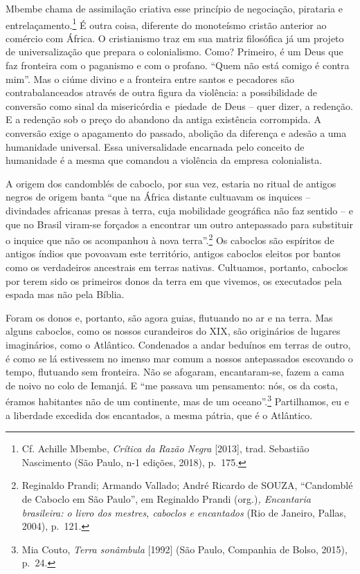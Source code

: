 Mbembe chama de assimilação criativa esse princípio de negociação,
pirataria e entrelaçamento.\footnote{Cf. Achille Mbembe, \emph{Crítica
  da Razão Negra} {[}2013{]}, trad. Sebastião Nascimento (São Paulo, n-1
  edições, 2018), p.~175.} É outra coisa, diferente do monoteísmo
cristão anterior ao comércio com África. O cristianismo traz em sua
matriz filosófica já um projeto de universalização que prepara o
colonialismo. Como? Primeiro, é um Deus que faz fronteira com o
paganismo e com o profano. ``Quem não está comigo é contra mim''. Mas o
ciúme divino e a fronteira entre santos e pecadores são
contrabalanceados através de outra figura da violência: a possibilidade
de conversão como sinal da misericórdia e~piedade~de Deus -- quer dizer,
a redenção. E a redenção sob o preço do abandono da antiga existência
corrompida. A conversão exige o apagamento do passado, abolição da
diferença e adesão a uma humanidade universal. Essa universalidade
encarnada pelo conceito de humanidade é a mesma que comandou a violência
da empresa colonialista.

A origem dos candomblés de caboclo, por sua vez, estaria no ritual de
antigos negros de origem banta ``que na África distante cultuavam os
inquices -- divindades africanas presas à terra, cuja mobilidade
geográfica não faz sentido -- e que no Brasil viram-se forçados a
encontrar um outro antepassado para substituir o inquice que não os
acompanhou à nova terra''.\footnote{Reginaldo Prandi; Armando Vallado;
  André Ricardo de SOUZA, ``Candomblé de Caboclo em São Paulo'', em
  Reginaldo Prandi (org.)\emph{, Encantaria brasileira: o livro dos
  mestres, caboclos e encantados} (Rio de Janeiro, Pallas, 2004),
  p.~121.} Os caboclos são espíritos de antigos índios que povoavam este
território, antigos caboclos eleitos por bantos como os verdadeiros
ancestrais em terras nativas. Cultuamos, portanto, caboclos por terem
sido os primeiros donos da terra em que vivemos, os executados pela
espada mas não pela Bíblia.

Foram os donos e, portanto, são agora guias, flutuando no ar e na terra.
Mas alguns caboclos, como os nossos curandeiros do XIX, são originários
de lugares imaginários, como o Atlântico. Condenados a andar beduínos em
terras de outro, é como se lá estivessem no imenso mar comum a nossos
antepassados escovando o tempo, flutuando sem fronteira. Não se
afogaram, encantaram-se, fazem a cama de noivo no colo de Iemanjá. E
``me passava um pensamento: nós, os da costa, éramos habitantes não de
um continente, mas de um oceano''.\footnote{Mia Couto, \emph{Terra
  sonâmbula} {[}1992{]} (São Paulo, Companhia de Bolso, 2015), p.~24.}
Partilhamos, eu e a liberdade excedida dos encantados, a mesma pátria,
que é o Atlântico.

